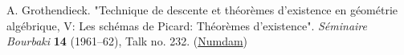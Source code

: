 
A. Grothendieck.
"Technique de descente et théorèmes d'existence en géométrie algébrique, V: Les schémas de Picard: Théorèmes d'existence".
\emph{Séminaire Bourbaki} \textbf{14} (1961–62), Talk no. 232.
(\href{http://www.numdam.org/book-part/SB_1961-1962__7__143_0/}{Numdam})